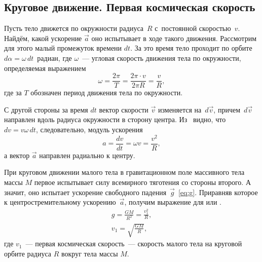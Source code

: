 \subsection{Круговое движение. Первая космическая скорость}

Пусть тело движется по окружности радиуса~$R$ с~постоянной скоростью~$v$. Найдём, какой ускорение $\vec a$ оно испытывает в ходе такого движения. Рассмотрим для этого малый промежуток времени $dt$. За это время тело проходит по орбите $d\alpha = \omega \, dt$~радиан, где $\omega$~--- угловая скорость движения тела по окружности, определяемая выражением
\begin{equation*}
    \omega = \frac{2 \pi}{T} = \frac{ 2\pi \cdot v}{2\pi R} = \frac{v}{R},
\end{equation*}
где за $T$ обозначен период движения тела по окружности.

С другой стороны за время $dt$ вектор скорости $\vec{v}$ изменяется на~$d \vec{v}$, причем~$d \vec{v}$ направлен вдоль радиуса окружности в сторону центра. Из~ видно, что $d v = v \omega \, dt$, следовательно, модуль ускорения
\begin{equation*}
    a = \frac{dv}{dt} = \omega v = \frac{v^2}{R},
\end{equation*}
а вектор $\vec a$ направлен радиально к центру.

При круговом движении малого тела в гравитационном поле массивного тела массы $M$ первое испытывает силу всемирного тяготения со стороны второго. А значит, оно испытает ускорение свободного падения~$\vec{g}$~\eqref{eq:g}. Приравняв которое к центростремительному ускорению~$\vec{a}$, получим выражение для  или .
\begin{gather}
    g = \frac{G M}{R^2} = \frac{v_1^2}{R},\nonumber\\
    v_1 = \sqrt{\frac{GM}{R}},
\end{gather}
где $v_1$~--- первая космическая скорость~--- скорость малого тела на круговой орбите радиуса $R$ вокруг тела массы $M$.
